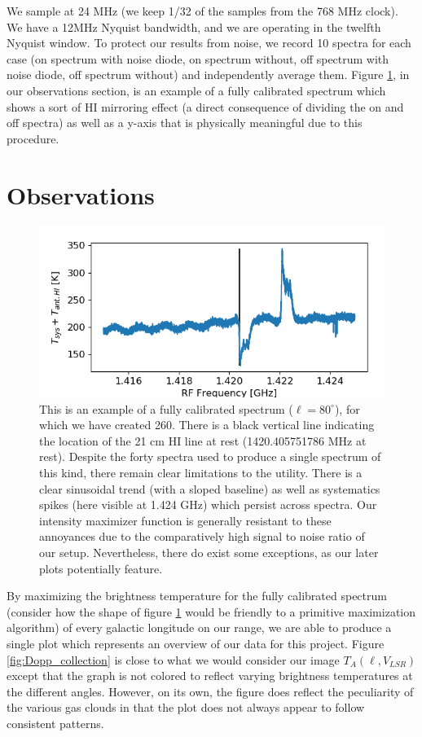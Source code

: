 \documentclass[12pt]{article}
\begin{document}
We sample at 24 MHz (we keep 1/32 of the samples from the 768 MHz clock). We have a 12MHz Nyquist bandwidth, and we are operating in the twelfth Nyquist window. To protect our results from noise, we record 10 spectra for each case (on spectrum with noise diode, on spectrum without, off spectrum with noise diode, off spectrum without) and independently average them. Figure \ref{fig:cal_ex}, in our observations section, is an example of a fully calibrated spectrum which shows a sort of HI mirroring effect (a direct consequence of dividing the on and off spectra) as well as a y-axis that is physically meaningful due to this procedure.

\section{Observations}

\begin{figure}
	\centering
	\includegraphics[width=.8\linewidth]{cal_ex_80_deg}
	\caption{This is an example of a fully calibrated spectrum ($\ell = 80^\circ$), for which we have created 260. There is a black vertical line indicating the location of the 21 cm HI line at rest (1420.405751786 MHz at rest). Despite the forty spectra used to produce a single spectrum of this kind, there remain clear limitations to the utility. There is a clear sinusoidal trend (with a sloped baseline) as well as systematics spikes (here visible at 1.424 GHz) which persist across spectra. Our intensity maximizer function is generally resistant to these annoyances due to the comparatively high signal to noise ratio of our setup. Nevertheless, there do exist some exceptions, as our later plots potentially feature.}
	\label{fig:cal_ex}
\end{figure}

\quad \quad By maximizing the brightness temperature for the fully calibrated spectrum (consider how the shape of figure \ref{fig:cal_ex} would be friendly to a primitive maximization algorithm) of every galactic longitude on our range, we are able to produce a single plot which represents an overview of our data for this project. Figure \ref{fig:Dopp_collection} is close to what we would consider our image $T_A(\ell, V_{LSR})$ except that the graph is not colored to reflect varying brightness temperatures at the different angles. However, on its own, the figure does reflect the peculiarity of the various gas clouds in that the plot does not always appear to follow consistent patterns.
\end{document}
